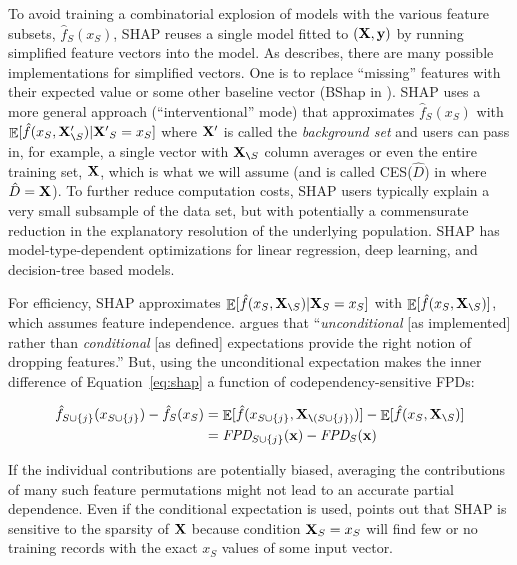 \documentclass[]{article} %
\renewcommand{\eqref}[1]{Equation~\ref{#1}}
\renewcommand{\slash}{\texttt{\char`\\}}
\DeclareMathOperator{\Ex}{\mathbb{E}}
\begin{document}
To avoid training a combinatorial explosion of models with the various feature subsets, $\hat{f}_S(x_S)$, SHAP reuses a single model fitted to $(\bf X, y)$ by running simplified feature vectors into the model. As  \citet{manyshap} describes, there are many possible implementations for simplified vectors. One is to replace ``missing''  features with their expected value or some other baseline vector (BShap in \citealt{manyshap}). SHAP uses a more general approach (``interventional'' mode) that approximates $\hat{f}_S(x_S)$ with $\Ex[\hat{f}(x_{S},{\bf X}'_{\slash S}) | {\bf X'}_S = x_S]$ where ${\bf X}'$ is called the {\em background set} and users can pass in, for example, a single vector with ${\bf X}_{\slash S}$ column averages or even the entire training set, $\bf X$, which is what we will assume (and is called CES($\hat{D}$) in \citealt{manyshap} where $\hat{D}={\bf X}$). To further reduce computation costs, SHAP users typically explain a very small subsample of the data set, but with potentially a commensurate reduction in the explanatory resolution of the underlying population. SHAP has model-type-dependent optimizations for linear regression, deep learning, and decision-tree based models.

For efficiency, SHAP approximates $\Ex[\hat{f}(x_{S},{\bf X}_{\slash S}) | {\bf X}_S = x_S]$ with $\Ex[\hat{f}(x_{S},{\bf X}_{\slash S})]$, which assumes feature independence. \citep{janzing2019feature} argues that ``{\em unconditional} [as implemented] rather than {\em conditional} [as defined] expectations provide the right notion of dropping features.''  But, using the unconditional expectation makes the inner difference of \eqref{eq:shap} a function of codependency-sensitive FPDs:

\vspace{-4mm}\begin{equation}
\begin{split}
\hat{f}_{S \cup \{j\}}(x_{S \cup \{j\}}) - \hat{f}_S(x_S) & = \Ex[\hat{f}(x_{S \cup \{j\}},{\bf X}_{\slash (S \cup \{j\})})] - \Ex[\hat{f}(x_{S},{\bf X}_{\slash S})]\\
 & = \text{\it FPD}_{S \cup \{j\}}({\bf x}) - \text{\it FPD}_{S}({\bf x})
\end{split}
\end{equation}\vspace{-2mm}

If the individual contributions are potentially biased, averaging the contributions of many such feature permutations might not lead to an accurate partial dependence.  Even if the conditional expectation is used, \citet{manyshap} points out that SHAP is sensitive to the sparsity of $\bf X$ because condition ${\bf X}_S = x_S$ will find few or no training records with the exact $x_S$ values of some input vector.
\end{document}
